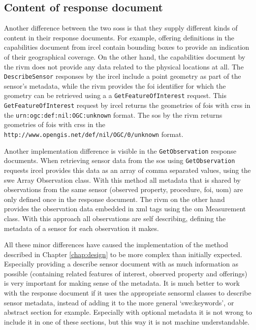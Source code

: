 \subsection{Content of response document}
\begin{sloppypar}
Another difference between the two \aclp{sos} is that they supply different kinds of content in their response documents. For example, offering definitions in the capabilities document from \ac{ircel} contain bounding boxes to provide an indication of their geographical coverage. On the other hand, the capabilities document by the \ac{rivm} does not provide any data related to the physical locations at all. The \texttt{DescribeSensor} responses by the \ac{ircel} include a point geometry as part of the sensor's metadata, while the \ac{rivm} provides the \ac{foi} identifier for which the geometry can be retrieved using a a \texttt{GetFeatureOfInterest} request. This \texttt{GetFeatureOfInterest} request by \ac{ircel} returns the geometries of \acp{foi} with \acp{crs} in the \texttt{urn:ogc:def:nil:OGC:unknown} format. The \ac{sos} by the \ac{rivm} returns geometries of \acp{foi} with \acp{crs} in the \texttt{http://www.opengis.net/def/nil/OGC/0/unknown} format. 
\end{sloppypar}

\begin{sloppypar}
Another implementation difference is visible in the \texttt{GetObservation} response documents. When retrieving sensor data from the \ac{sos} using \texttt{GetObservation} requests \ac{ircel} provides this data as an array of comma separated values, using the \ac{swe} Array Observation class. With this method all metadata that is shared by observations from the same sensor (observed property, procedure, \ac{foi}, \ac{uom}) are only defined once in the response document. The \ac{rivm} on the other hand provides the observation data embedded in \ac{xml} tags using the \ac{om} Measurement class. With this approach all observations are self describing, defining the metadata of a sensor for each observation it makes.   
\end{sloppypar}

All these minor differences have caused the implementation of the method described in Chapter \ref{chap:design} to be more complex than initially expected. Especially providing a describe sensor document with as much information as possible (containing related features of interest, observed property and offerings) is very important for making sense of the metadata. It is much better to work with the response document if it uses the appropriate \ac{sensorml} classes to describe sensor metadata, instead of adding it to the more general `swe:keywords', or abstract section for example. Especially with optional metadata it is not wrong to include it in one of these sections, but this way it is not machine understandable. 

